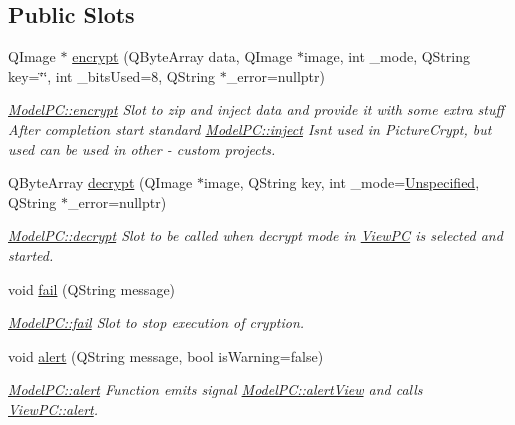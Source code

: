 \subsection*{Public Slots}
\begin{DoxyCompactItemize}
\item 
Q\+Image $\ast$ \hyperlink{class_model_p_c_a6f191f62d4635d0d3555fcc0be298794}{encrypt} (Q\+Byte\+Array data, Q\+Image $\ast$image, int \+\_\+mode, Q\+String key=\char`\"{}\char`\"{}, int \+\_\+bits\+Used=8, Q\+String $\ast$\+\_\+error=nullptr)
\begin{DoxyCompactList}\small\item\em \hyperlink{class_model_p_c_a6f191f62d4635d0d3555fcc0be298794}{Model\+P\+C\+::encrypt} Slot to zip and inject data and provide it with some extra stuff After completion start standard \hyperlink{class_model_p_c_aada6a04d81ada8f2b4ba18108c8d6f10}{Model\+P\+C\+::inject} Isn\textquotesingle{}t used in Picture\+Crypt, but used can be used in other -\/ custom projects. \end{DoxyCompactList}\item 
Q\+Byte\+Array \hyperlink{class_model_p_c_a69ea58f4455f8536c4be1d3f44424a60}{decrypt} (Q\+Image $\ast$image, Q\+String key, int \+\_\+mode=\hyperlink{class_model_p_c_a296dd7afe3e1c49b3da25fd644fe4ceba56028870bb6c96c44e7ba33b82d39598}{Unspecified}, Q\+String $\ast$\+\_\+error=nullptr)
\begin{DoxyCompactList}\small\item\em \hyperlink{class_model_p_c_a69ea58f4455f8536c4be1d3f44424a60}{Model\+P\+C\+::decrypt} Slot to be called when decrypt mode in \hyperlink{class_view_p_c}{View\+PC} is selected and started. \end{DoxyCompactList}\item 
void \hyperlink{class_model_p_c_a47464b59b7e37fcee25e55475708aabd}{fail} (Q\+String message)
\begin{DoxyCompactList}\small\item\em \hyperlink{class_model_p_c_a47464b59b7e37fcee25e55475708aabd}{Model\+P\+C\+::fail} Slot to stop execution of cryption. \end{DoxyCompactList}\item 
void \hyperlink{class_model_p_c_a9079a101d83672aa48fd2dbac797de40}{alert} (Q\+String message, bool is\+Warning=false)
\begin{DoxyCompactList}\small\item\em \hyperlink{class_model_p_c_a9079a101d83672aa48fd2dbac797de40}{Model\+P\+C\+::alert} Function emits signal \hyperlink{class_model_p_c_af0217a7ca5671e26090dc50a5dccdaf5}{Model\+P\+C\+::alert\+View} and calls \hyperlink{class_view_p_c_a7c467169467789561078abc9d4fe57bd}{View\+P\+C\+::alert}. \end{DoxyCompactList}\end{DoxyCompactItemize}
